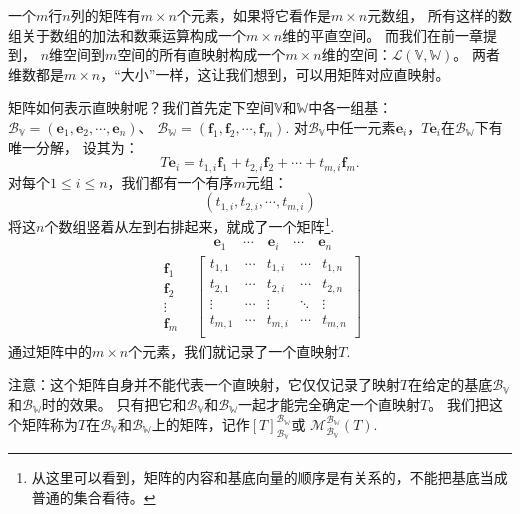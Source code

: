 \documentclass[12pt,UTF8,fontset=none]{ctexbook}
\begin{document}
一个$m$行$n$列的矩阵有$m\times n$个元素，如果将它看作是$m\times n$元数组，
所有这样的数组关于数组的加法和数乘运算构成一个$m\times n$维的平直空间。
而我们在前一章提到，
$n$维空间到$m$空间的所有直映射构成一个$m\times n$维的空间：$\mathcal{L}(\mathbb{V},\mathbb{W})$。
两者维数都是$m\times n$，“大小”一样，这让我们想到，可以用矩阵对应直映射。

矩阵如何表示直映射呢？我们首先定下空间$\mathbb{V}$和$\mathbb{W}$中各一组基：
$\mathcal{B}_{\mathbb{V}} = (\mathbf{e}_1, \mathbf{e}_2, \cdots, \mathbf{e}_n)$、
$\mathcal{B}_{\mathbb{W}} = (\mathbf{f}_1, \mathbf{f}_2, \cdots, \mathbf{f}_m)$.
对$\mathcal{B}_{\mathbb{V}}$中任一元素$\mathbf{e}_i$，$T\mathbf{e}_i$在$\mathcal{B}_{\mathbb{W}}$下有唯一分解，
设其为：
$$ T\mathbf{e}_i = t_{1,i}\mathbf{f}_1 + t_{2,i}\mathbf{f}_2 + \cdots + t_{m,i}\mathbf{f}_m.$$
对每个$1\leq i \leq n$，我们都有一个有序$m$元组：
$$ (t_{1,i}, t_{2,i}, \cdots, t_{m,i}) $$ 
将这$n$个数组竖着从左到右排起来，就成了一个矩阵\footnote{从这里可以看到，矩阵的内容和基底向量的顺序是有关系的，不能把基底当成普通的集合看待。}.
\begin{align*}
  \quad  & \quad \,\, \mathbf{e}_1 \quad \, \cdots \quad \mathbf{e}_i \quad \cdots \quad  \mathbf{e}_n  \\
\begin{matrix} \mathbf{f}_1 \\ \mathbf{f}_2 \\ \vdots \\ \mathbf{f}_m \end{matrix} & \left[
\begin{matrix}
 t_{1,1}     & \cdots & t_{1,i}   & \cdots & t_{1,n} \\
 t_{2,1}     & \cdots & t_{2,i}   & \cdots & t_{2,n} \\
 \vdots      & \cdots & \vdots    & \ddots & \vdots  \\
 t_{m,1}     & \cdots & t_{m,i}   & \cdots & t_{m,n} \\
\end{matrix}
\right]   
\end{align*}
通过矩阵中的$m\times n$个元素，我们就记录了一个直映射$T$.

注意：这个矩阵自身并不能代表一个直映射，它仅仅记录了映射$T$在给定的基底$\mathcal{B}_{\mathbb{V}}$和$\mathcal{B}_{\mathbb{W}}$时的效果。
只有把它和$\mathcal{B}_{\mathbb{V}}$和$\mathcal{B}_{\mathbb{W}}$一起才能完全确定一个直映射$T$。
我们把这个矩阵称为$T$在$\mathcal{B}_{\mathbb{V}}$和$\mathcal{B}_{\mathbb{W}}$上的矩阵，记作$[T]_{\mathcal{B}_{\mathbb{V}}}^{\mathcal{B}_{\mathbb{W}}}$或
$\mathcal{M}_{\mathcal{B}_{\mathbb{V}}}^{\mathcal{B}_{\mathbb{W}}}(T).$
\end{document}
